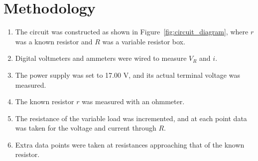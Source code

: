 \documentclass[twocolumn,english]{IEEEtran}
\theoremstyle{plain}
\theoremstyle{plain}
\begin{document}
\section{Methodology}
\begin{enumerate}
 \item The circuit was constructed as shown in Figure~\ref{fig:circuit_diagram}, where $r$ was a known resistor and $R$ was a variable resistor box.
 \item Digital voltmeters and ammeters were wired to measure $V_R$ and $i$.
 \item The power supply was set to 17.00 V, and its actual terminal voltage was measured.
 \item The known resistor $r$ was measured with an ohmmeter.
 \item The resistance of the variable load was incremented, and at each point data was taken for the voltage and current through $R$.
 \item Extra data points were taken at resistances approaching that of the known resistor.
\end{enumerate}

\noindent \hrulefill
\end{document}
